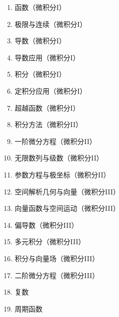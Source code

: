 \documentclass{report}
\begin{document}
\begin{enumerate}
    \item 函数（微积分I）
    \item 极限与连续（微积分I）
    \item 导数（微积分I）
    \item 导数应用（微积分I）
    \item 积分（微积分I）
    \item 定积分应用（微积分I）
    \item 超越函数（微积分I）
    \item 积分方法（微积分II）
    \item 一阶微分方程（微积分II）
    \item 无限数列与级数（微积分II）
    \item 参数方程与极坐标（微积分II）
    \item 空间解析几何与向量（微积分III）
    \item 向量函数与空间运动（微积分III）
    \item 偏导数（微积分III）
    \item 多元积分（微积分III）
    \item 积分与向量场（微积分III）
    \item 二阶微分方程（微积分III）
    \item 复数
    \item 周期函数
\end{enumerate}

\newpage
\end{document}
